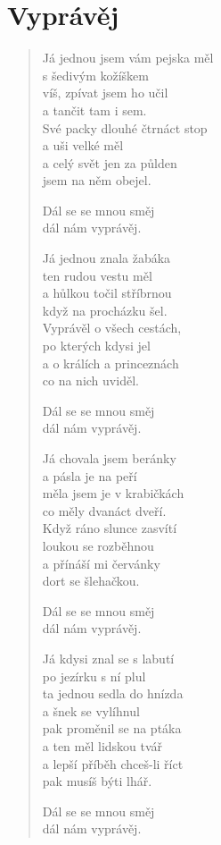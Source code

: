 \section*{Vyprávěj}

\begin{verse}
Já jednou jsem vám pejska měl \\
s šedivým kožíškem \\
víš, zpívat jsem ho učil \\
a tančit tam i sem.\\
Své packy dlouhé čtrnáct stop\\
a uši velké měl\\
a celý svět jen za půlden\\
jsem na něm obejel.

Dál se se mnou směj\\
dál nám vyprávěj.

Já jednou znala žabáka\\
ten rudou vestu měl\\
a hůlkou točil stříbrnou\\
když na procházku šel.\\
Vyprávěl o všech cestách,\\
po kterých kdysi jel\\
a o králích a princeznách\\
co na nich uviděl.

Dál se se mnou směj\\
dál nám vyprávěj.

Já chovala jsem beránky\\
a pásla je na peří\\
měla jsem je v krabičkách\\
co měly dvanáct dveří.\\
Když ráno slunce zasvítí\\
loukou se rozběhnou\\
a přínáší mi červánky\\
dort se šlehačkou.

Dál se se mnou směj\\
dál nám vyprávěj.

Já kdysi znal se s labutí\\
po jezírku s ní plul\\
ta jednou sedla do hnízda\\
a šnek se vylíhnul\\
pak proměnil se na ptáka\\
a ten měl lidskou tvář\\
a lepší příběh chceš-li říct\\
pak musíš býti lhář.

Dál se se mnou směj\\
dál nám vyprávěj.

\end{verse}
